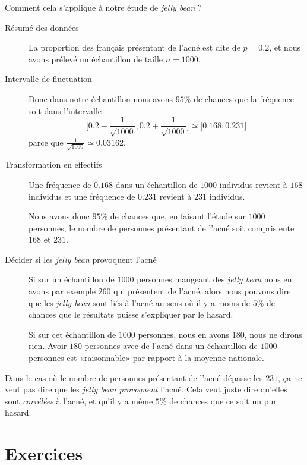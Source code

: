 Comment cela s'applique à notre étude de \emph{jelly bean} ? 
\begin{description}
    \item[Résumé des données]
        La proportion des français présentant de l'acné est dite de \( p=0.2\), et nous avons prélevé un échantillon de taille \( n=1000\). 
    \item[Intervalle de fluctuation] 
        Donc dans notre échantillon nous avons \( 95\%\) de chances que la fréquence soit dans l'intervalle
        \begin{equation}
            \mathopen[ 0.2-\frac{1}{ \sqrt{1000} } ; 0.2+\frac{1}{ \sqrt{1000} } \mathclose]\simeq\mathopen[ 0.168 ; 0.231 \mathclose]
        \end{equation}
        parce que \( \frac{1}{ \sqrt{1000} }\simeq 0.03162\).
    \item[Transformation en effectifs]

        Une fréquence de \( 0.168\) dans un échantillon de \( 1000\) individus revient à \( 168\) individus et une fréquence de \( 0.231\) revient à \( 231\) individus.

        Nous avons donc \( 95\%\) de chances que, en faisant l'étude sur \( 1000\) personnes, le nombre de personnes présentant de l'acné soit compris ente \( 168\) et \( 231\).
    \item[Décider si les \emph{jelly bean} provoquent l'acné]
        Si sur un échantillon de \( 1000\) personnes mangeant des \emph{jelly bean} nous en avons par exemple \( 260\) qui présentent de l'acné, alors nous pouvons dire que les \emph{jelly bean} sont liés à l'acné au sens où il y a moins de \( 5\%\) de chances que le résultats puisse s'expliquer par le hasard.

        Si sur cet échantillon de \( 1000\) personnes, nous en avons \( 180\), nous ne dirons rien. Avoir \( 180\) personnes avec de l'acné dans un échantillon de \( 1000\) personnes est «raisonnable» par rapport à la moyenne nationale.
\end{description}

\begin{remark}
    Dans le cas où le nombre de personnes présentant de l'acné dépasse les \( 231\), ça ne veut pas dire que les \emph{jelly bean} \emph{provoquent} l'acné. Cela veut juste dire qu'elles sont \emph{corrélées} à l'acné, et qu'il y a même \( 5\%\) de chances que ce soit un pur hasard.
\end{remark}

\section{Exercices}

